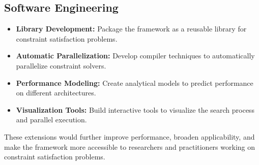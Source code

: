 \subsection{Software Engineering}
\begin{itemize}
    \item \textbf{Library Development:} Package the framework as a reusable library for constraint satisfaction problems.
    
    \item \textbf{Automatic Parallelization:} Develop compiler techniques to automatically parallelize constraint solvers.
    
    \item \textbf{Performance Modeling:} Create analytical models to predict performance on different architectures.
    
    \item \textbf{Visualization Tools:} Build interactive tools to visualize the search process and parallel execution.
\end{itemize}

These extensions would further improve performance, broaden applicability, and make the framework more accessible to researchers and practitioners working on constraint satisfaction problems.
